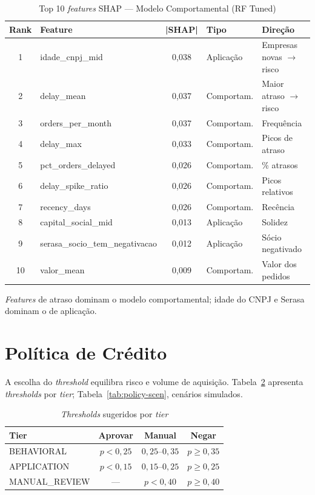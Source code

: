 \documentclass[conference]{IEEEtran}
\begin{document}
\begin{table}[!t]
\caption{Top 10 \textit{features} SHAP --- Modelo Comportamental (RF Tuned)}
\label{tab:shap-behav}
\centering
\small
\begin{tabular}{clcll}
\toprule
\textbf{Rank} & \textbf{Feature} & \textbf{|SHAP|} & \textbf{Tipo} & \textbf{Direção} \\
\midrule
1 & idade\_cnpj\_mid & 0,038 & Aplicação & Empresas novas $\rightarrow$ risco \\
2 & delay\_mean & 0,037 & Comportam. & Maior atraso $\rightarrow$ risco \\
3 & orders\_per\_month & 0,037 & Comportam. & Frequência \\
4 & delay\_max & 0,033 & Comportam. & Picos de atraso \\
5 & pct\_orders\_delayed & 0,026 & Comportam. & \% atrasos \\
6 & delay\_spike\_ratio & 0,026 & Comportam. & Picos relativos \\
7 & recency\_days & 0,026 & Comportam. & Recência \\
8 & capital\_social\_mid & 0,013 & Aplicação & Solidez \\
9 & serasa\_socio\_tem\_negativacao & 0,012 & Aplicação & Sócio negativado \\
10 & valor\_mean & 0,009 & Comportam. & Valor dos pedidos \\
\bottomrule
\end{tabular}
\end{table}

\textit{Features} de atraso dominam o modelo comportamental; idade do CNPJ e Serasa dominam o de aplicação.

\section{Política de Crédito}

A escolha do \textit{threshold} equilibra risco e volume de aquisição. Tabela~\ref{tab:policy-thresh} apresenta \textit{thresholds} por \textit{tier}; Tabela~\ref{tab:policy-scen}, cenários simulados.

\begin{table}[!t]
\caption{\textit{Thresholds} sugeridos por \textit{tier}}
\label{tab:policy-thresh}
\centering
\small
\begin{tabular}{lccc}
\toprule
\textbf{Tier} & \textbf{Aprovar} & \textbf{Manual} & \textbf{Negar} \\
\midrule
BEHAVIORAL & $p < 0{,}25$ & $0{,}25$--$0{,}35$ & $p \geq 0{,}35$ \\
APPLICATION & $p < 0{,}15$ & $0{,}15$--$0{,}25$ & $p \geq 0{,}25$ \\
MANUAL\_REVIEW & --- & $p < 0{,}40$ & $p \geq 0{,}40$ \\
\bottomrule
\end{tabular}
\end{table}
\end{document}
